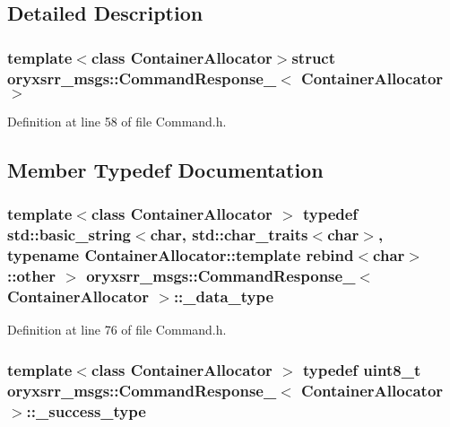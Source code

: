 \subsection{\-Detailed \-Description}
\subsubsection*{template$<$class Container\-Allocator$>$struct oryxsrr\-\_\-msgs\-::\-Command\-Response\-\_\-$<$ Container\-Allocator $>$}



\-Definition at line 58 of file \-Command.\-h.



\subsection{\-Member \-Typedef \-Documentation}
\subsubsection[{\-\_\-data\-\_\-type}]{\setlength{\rightskip}{0pt plus 5cm}template$<$class Container\-Allocator $>$ typedef std\-::basic\-\_\-string$<$char, std\-::char\-\_\-traits$<$char$>$, typename \-Container\-Allocator\-::template rebind$<$char$>$\-::other $>$ {\bf oryxsrr\-\_\-msgs\-::\-Command\-Response\-\_\-}$<$ \-Container\-Allocator $>$\-::{\bf \-\_\-data\-\_\-type}}\label{structoryxsrr__msgs_1_1CommandResponse___a914103ea462fa87c2b24cb7a6dd5114e}


\-Definition at line 76 of file \-Command.\-h.

\subsubsection[{\-\_\-success\-\_\-type}]{\setlength{\rightskip}{0pt plus 5cm}template$<$class Container\-Allocator $>$ typedef uint8\-\_\-t {\bf oryxsrr\-\_\-msgs\-::\-Command\-Response\-\_\-}$<$ \-Container\-Allocator $>$\-::{\bf \-\_\-success\-\_\-type}}\label{structoryxsrr__msgs_1_1CommandResponse___a2d2134b2d82ee2fe53cac5775eb9db6b}


